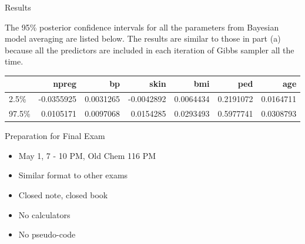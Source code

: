\documentclass[ignorenonframetext,]{beamer}
\newenvironment{Shaded}{\begin{snugshade}}{\end{snugshade}}
\newcommand{\KeywordTok}[1]{\textcolor[rgb]{0.13,0.29,0.53}{\textbf{#1}}}
\newcommand{\DataTypeTok}[1]{\textcolor[rgb]{0.13,0.29,0.53}{#1}}
\newcommand{\DecValTok}[1]{\textcolor[rgb]{0.00,0.00,0.81}{#1}}
\newcommand{\FloatTok}[1]{\textcolor[rgb]{0.00,0.00,0.81}{#1}}
\newcommand{\StringTok}[1]{\textcolor[rgb]{0.31,0.60,0.02}{#1}}
\newcommand{\CommentTok}[1]{\textcolor[rgb]{0.56,0.35,0.01}{\textit{#1}}}
\newcommand{\OperatorTok}[1]{\textcolor[rgb]{0.81,0.36,0.00}{\textbf{#1}}}
\newcommand{\NormalTok}[1]{#1}
\providecommand{\tightlist}{%
  \setlength{\itemsep}{0pt}\setlength{\parskip}{0pt}}
\begin{document}
\begin{frame}[fragile]{Results}

The 95\% posterior confidence intervals for all the parameters from
Bayesian model averaging are listed below. The results are similar to
those in part (a) because all the predictors are included in each
iteration of Gibbs sampler all the time.

\footnotesize

\begin{Shaded}
\end{Shaded}

\begin{longtable}[]{@{}lrrrrrr@{}}
\toprule
& npreg & bp & skin & bmi & ped & age\tabularnewline
\midrule
\endhead
2.5\% & -0.0355925 & 0.0031265 & -0.0042892 & 0.0064434 & 0.2191072 &
0.0164711\tabularnewline
97.5\% & 0.0105171 & 0.0097068 & 0.0154285 & 0.0293493 & 0.5977741 &
0.0308793\tabularnewline
\bottomrule
\end{longtable}

\end{frame}

\begin{frame}{Preparation for Final Exam}

\begin{itemize}
\tightlist
\item
  May 1, 7 - 10 PM, Old Chem 116 PM
\item
  Similar format to other exams
\item
  Closed note, closed book
\item
  No calculators
\item
  No pseudo-code
\end{itemize}

\end{frame}
\end{document}

